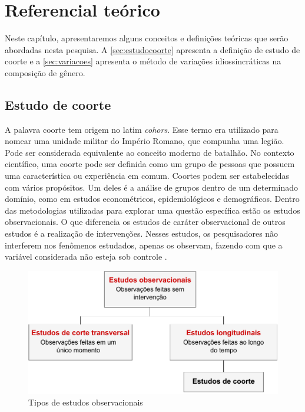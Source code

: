 \chapter{Referencial teórico}
Neste capítulo, apresentaremos alguns conceitos e definições teóricas que serão abordadas nesta pesquisa. A \autoref{sec:estudocoorte} apresenta a definição de estudo de coorte e a \autoref{sec:variacoes} apresenta o método de variações idiossincráticas na composição de gênero.

\section{Estudo de coorte}
\label{sec:estudocoorte}
A palavra coorte tem origem no latim \textit{cohors}. Esse termo era utilizado para nomear uma unidade militar do Império Romano, que compunha uma legião. Pode ser considerada equivalente ao conceito moderno de batalhão. No contexto científico, uma coorte pode ser definida como um grupo de pessoas que possuem uma característica ou experiência em comum. Coortes podem ser estabelecidas com vários propósitos. Um deles é a análise de grupos dentro de um determinado domínio, como em estudos econométricos, epidemiológicos e demográficos. Dentro das metodologias utilizadas para explorar uma questão específica estão os estudos observacionais. O que diferencia os estudos de caráter observacional de outros estudos é a realização de intervenções. Nesses estudos, os pesquisadores não interferem nos fenômenos estudados, apenas os observam, fazendo com que a variável considerada não esteja sob controle \autocite{Song2010}.

\begin{figure}[h]
\caption{Tipos de estudos observacionais}
\centering
\includegraphics{figuras/Diagrama tipos de estudos observacionais.pdf}
\end{figure}


